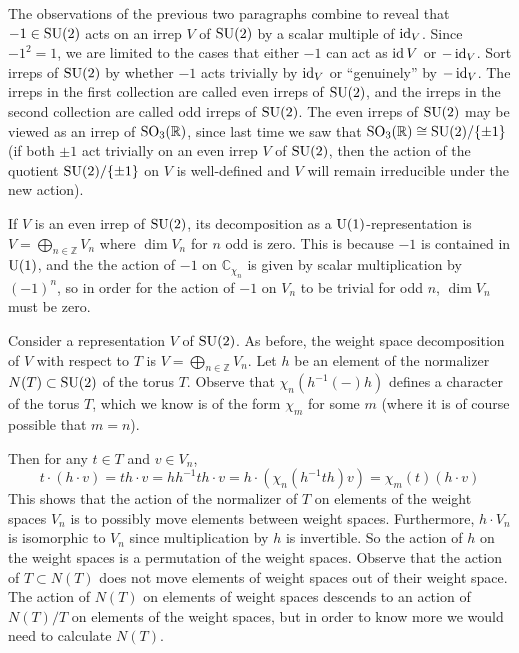 \documentclass[../../rtnotes.tex]{subfiles}
\begin{document}
The observations of the previous two paragraphs combine to reveal that $-1\in \operatorname{SU}(2)$ acts on an irrep $V$ of $\operatorname{SU}(2)$ by a scalar multiple of $\operatorname{id}_V$. Since $-1^2 = 1$, we are limited to the cases that either $-1$ can act as $\operatorname{id} V$ or $-\operatorname{id}_V$. Sort irreps of $\operatorname{SU}(2)$ by whether $-1$ acts trivially by $\operatorname{id}_V$ or ``genuinely'' by $-\operatorname{id}_V$. The irreps in the first collection are called even irreps of $\operatorname{SU}(2)$, and the irreps in the second collection are called odd irreps of $\operatorname{SU}(2)$. The even irreps of $\operatorname{SU}(2)$ may be viewed as an irrep of $\operatorname{SO}_3(\mathbb R)$, since last time we saw that $\operatorname{SO}_3(\mathbb R)\cong \operatorname{SU}(2)/\{\pm 1\}$ (if both $\pm 1$ act trivially on an even irrep $V$ of $\operatorname{SU}(2)$, then the action of the quotient $\operatorname{SU}(2)/\{\pm 1\}$ on $V$ is well-defined and $V$ will remain irreducible under the new action).

If $V$ is an even irrep of $\operatorname{SU}(2)$, its decomposition as a $\operatorname{U}(1)$-representation is $V = \bigoplus_{n\in\mathbb Z}V_n$ where $\dim V_n$ for $n$ odd is zero. This is because $-1$ is contained in $\operatorname{U}(1)$, and the the action of $-1$ on $\mathbb C_{\chi_n}$ is given by scalar multiplication by $(-1)^n$, so in order for the action of $-1$ on $V_n$ to be trivial for odd $n$, $\dim V_n$ must be zero.

Consider a representation $V$ of $\operatorname{SU}(2)$. As before, the weight space decomposition of $V$ with respect to $T$ is $V = \bigoplus_{n\in\mathbb Z}V_n$. Let $h$ be an element of the normalizer $N(T)\subset \operatorname{SU}(2)$ of the torus $T$. Observe that $\chi_n(h^{-1}(-)h)$ defines a character of the torus $T$, which we know is of the form $\chi_m$ for some $m$ (where it is of course possible that $m = n$).

Then for any $t\in T$ and $v\in V_n$, 
\[t\cdot (h\cdot v) = th\cdot v = hh^{-1}th\cdot v = h\cdot (\chi_n(h^{-1}th)v) = \chi_m(t)(h\cdot v)\]
This shows that the action of the normalizer of $T$ on elements of the weight spaces $V_n$ is to possibly move elements between weight spaces. Furthermore, $h\cdot V_n$ is isomorphic to $V_n$ since multiplication by $h$ is invertible. So the action of $h$ on the weight spaces is a permutation of the weight spaces. Observe that the action of $T\subset N(T)$ does not move elements of weight spaces out of their weight space. The action of $N(T)$ on elements of weight spaces descends to an action of $N(T)/T$ on elements of the weight spaces, but in order to know more we would need to calculate $N(T)$.
\end{document}

